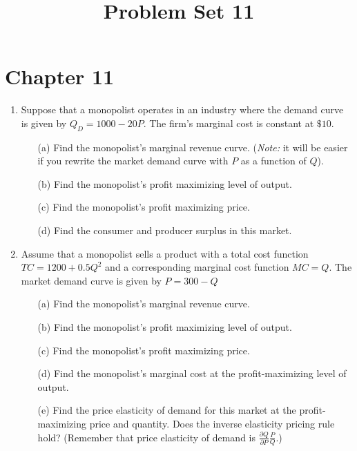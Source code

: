 \documentclass[11pt]{article}
\title{Problem Set 11}
\begin{document}
 
  
\section*{Chapter 11}

\begin{enumerate}
  \item Suppose that a monopolist operates in an industry where the demand curve is given by $Q_D = 1000 - 20P$. The firm's marginal cost is constant at $\$10$.
  \begin{enumerate}
    \item[(a)] Find the monopolist's marginal revenue curve. (\emph{Note:} it will be easier if you rewrite the market demand curve with $P$ as a function of $Q$).

    \item[(b)] Find the monopolist's profit maximizing level of output.

    \item[(c)] Find the monopolist's profit maximizing price.

    \item[(d)] Find the consumer and producer surplus in this market.
  \end{enumerate}

  \item Assume that a monopolist sells a product with a total cost function $TC = 1200 + 0.5 Q^2$ and a corresponding marginal cost function $MC = Q$. The market demand curve is given by $P = 300 - Q$

  \begin{enumerate}
    \item[(a)] Find the monopolist's marginal revenue curve.

    \item[(b)] Find the monopolist's profit maximizing level of output.

    \item[(c)] Find the monopolist's profit maximizing price.

    \item[(d)] Find the monopolist's marginal cost at the profit-maximizing level of output.

    \item[(e)] Find the price elasticity of demand for this market at the profit-maximizing price and quantity. Does the inverse elasticity pricing rule hold? (Remember that price elasticity of demand is $\frac{\partial Q}{\partial P} \frac{P}{Q}$.)
  \end{enumerate}



\end{enumerate}
\end{document}
